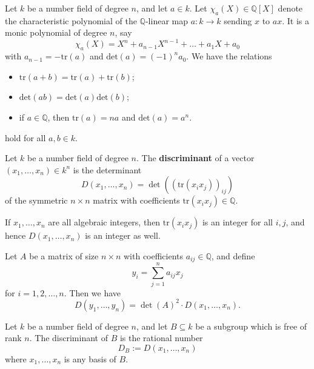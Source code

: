 \documentclass[12pt, a4paper]{article}
\begin{document}
\begin{mdprop}
    Let \( k \) be a number field of degree \( n \), and let \( a \in k \). Let \( \chi_a(X) \in \mathbb{Q}[X] \) denote the characteristic polynomial of the \( \mathbb{Q} \)-linear map \( a: k \rightarrow k \) sending \( x \) to \( ax \). It is a monic polynomial of degree \( n \), say
\[
\chi_a(X) = X^n + a_{n-1}X^{n-1} + \ldots + a_1X + a_0
\]
with \( a_{n-1} = -\text{tr}(a) \) and \(\text{det}(a) = (-1)^n a_0 \). We have the relations 
\begin{itemize}
    \item \( \text{tr}(a+b) = \text{tr}(a) + \text{tr}(b) \);
    \item \( \text{det}(ab) = \text{det}(a)\text{det}(b) \);
    \item if \( a \in \mathbb{Q} \), then \( \text{tr}(a) = na \) and \( \text{det}(a) = a^n \).
\end{itemize}
hold for all \( a, b \in k \). 
\end{mdprop}

\begin{definition}
    Let \( k \) be a number field of degree \( n \). The \textbf{discriminant} of a vector \( (x_1, \ldots, x_n) \in k^n \) is the determinant
    \[ D(x_1, \ldots, x_n) = \det( (\text{tr}(x_ix_j))_{ij} ) \]
    of the symmetric \( n \times n \) matrix with coefficients \( \text{tr}(x_ix_j) \in \mathbb{Q} \).
\end{definition}

\begin{mdremark}
    If \( x_1, \ldots, x_n \) are all algebraic integers, then \( \text{tr}(x_ix_j) \) is an integer for all \( i, j \), and hence \( D(x_1, \ldots, x_n) \) is an integer as well.
\end{mdremark}

\begin{mdprop}
    Let \( A \) be a matrix of size \( n \times n \) with coefficients \( a_{ij} \in \mathbb{Q} \), and define
    \[ y_i = \sum_{j=1}^{n} a_{ij}x_j \]
    for \( i = 1, 2, \ldots, n \). Then we have 
    \[D(y_1, \ldots, y_n) = \det(A)^2 \cdot D(x_1, \ldots, x_n).\]
\end{mdprop}

\begin{definition}
    Let \( k \) be a number field of degree \( n \), and let \( B \subseteq k \) be a subgroup which is free of rank \( n \). The discriminant of \( B \) is the rational number
    \[ D_B := D(x_1, \ldots, x_n) \]
    where \( x_1, \ldots, x_n \) is any basis of \( B \).
\end{definition}
\end{document}
